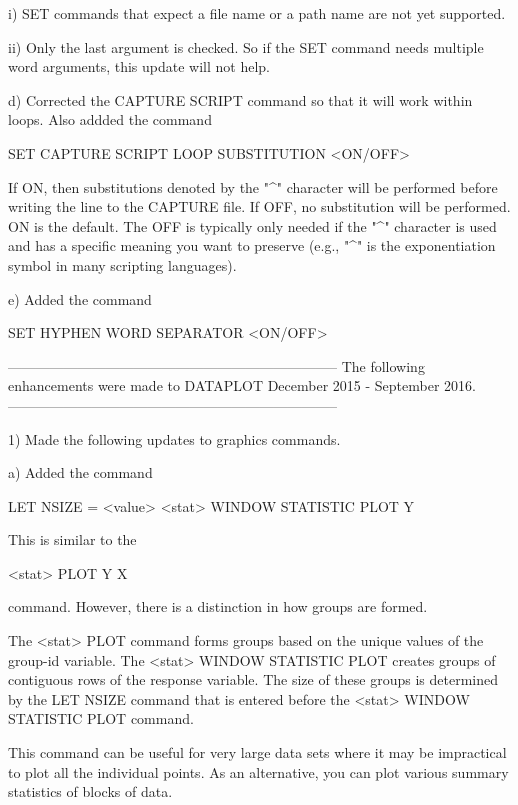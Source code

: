           i) SET commands that expect a file name or a path name
             are not yet supported.

         ii) Only the last argument is checked.  So if the SET
             command needs multiple word arguments, this update
             will not help.

    d) Corrected the CAPTURE SCRIPT command so that it will work within
       loops.  Also addded the command

          SET CAPTURE SCRIPT LOOP SUBSTITUTION <ON/OFF>

       If ON, then substitutions denoted by the "^" character will be
       performed before writing the line to the CAPTURE file.  If OFF,
       no substitution will be performed.  ON is the default.  The OFF
       is typically only needed if the "^" character is used and has
       a specific meaning you want to preserve (e.g., "^" is the
       exponentiation symbol in many scripting languages).

    e) Added the command

          SET HYPHEN WORD SEPARATOR <ON/OFF>

-----------------------------------------------------------------------
The following enhancements were made to DATAPLOT
December 2015 - September 2016.
-----------------------------------------------------------------------

 1) Made the following updates to graphics commands.

    a) Added the command

          LET NSIZE = <value>
          <stat> WINDOW STATISTIC PLOT Y

       This is similar to the

          <stat> PLOT Y X

       command.  However, there is a distinction in how groups are
       formed.

       The <stat> PLOT command forms groups based on the unique values of
       the group-id variable.  The <stat> WINDOW STATISTIC PLOT creates
       groups of contiguous rows of the response variable.  The size of
       these groups is determined by the LET NSIZE command that is
       entered before the <stat> WINDOW STATISTIC PLOT command.

       This command can be useful for very large data sets where it may
       be impractical to plot all the individual points.  As an
       alternative, you can plot various summary statistics of blocks
       of data.

